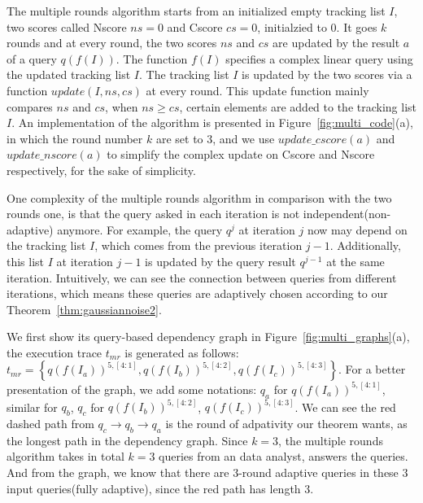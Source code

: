 %
The multiple rounds algorithm starts from an initialized empty tracking list $I$, two scores called Nscore $ns=0$ and Cscore $cs=0$, initialzied to $0$. It goes $k$ rounds and at every round, the two scores $ns$ and $cs$ are updated by the result $a$ of a query $q(f(I))$. The function $f( I)$ specifies a complex linear query using the updated tracking list $I$. The tracking list $I$ is updated by the two scores via a function $update(I,ns,cs)$ at every round. This update function mainly compares $ns$ and $cs$, when $ns \geq cs$, certain elements are added to the tracking list $I$. An implementation of the algorithm is presented in Figure~\ref{fig:multi_code}(a), in which the round number $k$ are set to $3$, and we use $update\_cscore(a)$ and $update\_nscore(a)$ to simplify the complex update on Cscore and Nscore respectively, for the sake of simplicity.

One complexity of the multiple rounds algorithm in comparison with the two rounds one, is that the query asked in each iteration is not independent(non-adaptive) anymore.
For example, the query $q^{j}$ at iteration $j$ now may depend on the tracking list $I$, which comes from the previous iteration $j-1$. Additionally, this list $I$ at iteration $j-1$ is updated by the query result $q^{j-1}$ at the same iteration. Intuitively, we can see the connection between queries from different iterations, which means these queries are adaptively chosen according to our Theorem~\ref{thm:gaussiannoise2}.

%

We first show its query-based dependency graph in Figure~\ref{fig:multi_graphs}(a), the execution trace $t_{mr}$ is generated as follows:
$
 t_{mr} = \left\{
q(f( I_a))^{5, [4:1]}, 
q(f( I_b))^{5, [4:2]},
q(f( I_c))^{5, [4:3]}
\right \}
$.
For a better presentation of the graph, we add some notations: $q_a$ for $q(f( I_a))^{5, [4:1]}$, similar for $q_b$, $q_c$ for $q(f( I_b))^{5, [4:2]}$, $q(f( I_c))^{5, [4:3]}$. We can see the red dashed path from $q_c \to q_b \to q_a$ is the round of adpativity our theorem wants, as the longest path in the dependency graph. Since $k =3$, the multiple rounds algorithm takes in total $k=3$ queries from an data analyst, answers the queries. And from the graph, we know that there are 3-round adaptive queries in these 3 input queries(fully adaptive), since the red path has length $3$. 

